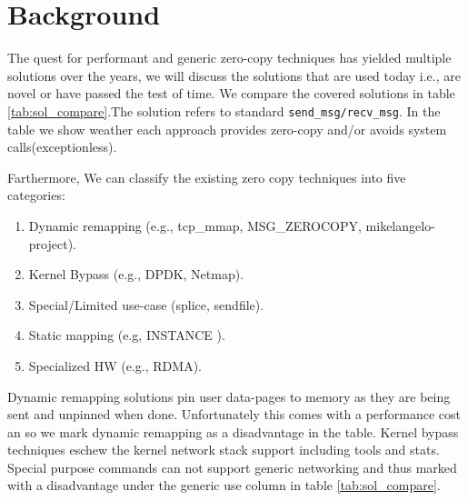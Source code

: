 
\section{Background}\label{sec:background}
The quest for performant and generic zero-copy techniques has yielded multiple solutions over the years, we will discuss the solutions that are used today i.e., are novel or have passed the test of time.
We compare the covered solutions in table \ref{tab:sol_compare}.The  solution refers to standard \texttt{send\_msg/recv\_msg}. In the table we show weather each approach provides zero-copy and/or avoids system calls(exceptionless).

Farthermore, We can classify the existing zero copy techniques into five categories:
\begin{enumerate}
    \item Dynamic remapping (e.g., tcp\_mmap, MSG\_ZEROCOPY\cite{desendmsg}, mikelangelo-project\cite{mikelangelo}).
    \item Kernel Bypass (e.g., DPDK, Netmap\cite{rizzo2012netmap}).
    \item Special/Limited use-case (splice, sendfile).
    \item Static mapping (e.g, INSTANCE \cite{instance}).
    \item Specialized HW (e.g., RDMA).
\end{enumerate}
Dynamic remapping solutions pin user data-pages to memory as they are being sent and unpinned when done. Unfortunately this comes with a performance cost an so we mark dynamic remapping as  a disadvantage in the table. Kernel bypass techniques eschew the kernel network stack support including tools and stats. Special purpose commands can not support generic networking and thus marked with a disadvantage under the generic use column in table \ref{tab:sol_compare}.





